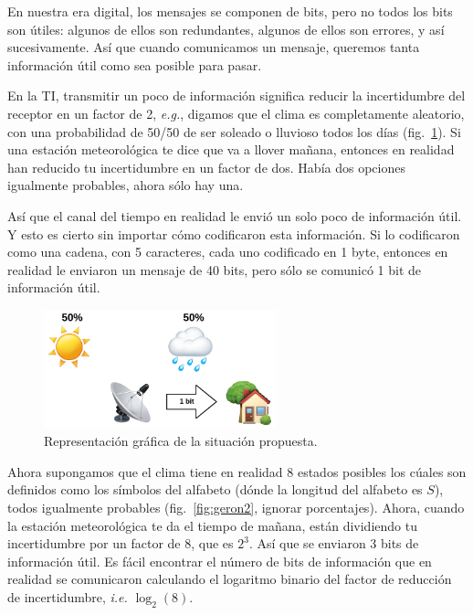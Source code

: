 \documentclass[a4paper,12pt]{article}
\begin{document}
En nuestra era digital, los mensajes se componen de bits, pero no todos los bits son útiles: algunos de ellos son redundantes, algunos de ellos son errores, y así sucesivamente. Así que cuando comunicamos un mensaje, queremos tanta información útil como sea posible para pasar. 

\clearpage

En la TI, transmitir un poco de información significa reducir la incertidumbre del receptor en un factor de 2, \textit{e.g.}, digamos que el clima es completamente aleatorio, con una probabilidad de 50/50 de ser soleado o lluvioso todos los días (fig.~\ref{fig:geron1}). Si una estación meteorológica te dice que va a llover mañana, entonces en realidad han reducido tu incertidumbre en un factor de dos. Había dos opciones igualmente probables, ahora sólo hay una. \citep{Geron2018Feb}

Así que el canal del tiempo en realidad le envió un solo poco de información útil. Y esto es cierto sin importar cómo codificaron esta información. Si lo codificaron como una cadena, con 5 caracteres, cada uno codificado en 1 byte, entonces en realidad le enviaron un mensaje de 40 bits, pero sólo se comunicó 1 bit de información útil.

\begin{figure}[H]
	\begin{center}
		\includegraphics[width=0.6\textwidth]{geron_1.png}
		\caption{Representación gráfica de la situación propuesta.}
		\label{fig:geron1}
	\end{center}
\end{figure}

Ahora supongamos que el clima tiene en realidad 8 estados posibles los cúales son definidos como los símbolos del alfabeto (dónde la longitud del alfabeto es $S$), todos igualmente probables (fig.~\ref{fig:geron2}, ignorar porcentajes). Ahora, cuando la estación meteorológica te da el tiempo de mañana, están dividiendo tu incertidumbre por un factor de 8, que es $2^3$. Así que se enviaron 3 bits de información útil. Es fácil encontrar el número de bits de información que en realidad se comunicaron calculando el logaritmo binario del factor de reducción de incertidumbre, \textit{i.e.} $\log_2(8)$.
\end{document}
